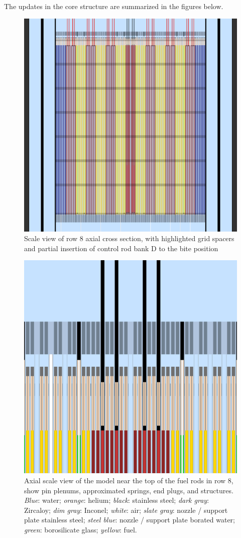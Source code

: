 \documentclass{article}
\begin{document}
The updates in the core structure are summarized in the figures below.

\begin{figure}[ht]
\centering
\includegraphics[keepaspectratio, width = 4.5 in]{figures/row_8_mats_axial_grids_enhanced}
\caption{Scale view of row 8 axial cross section, with highlighted grid spacers and partial insertion of control rod bank D to the bite position}
\label{fig:axial_row_8}
\end{figure}
\FloatBarrier 

\begin{figure}[ht]
\centering
\centering
\includegraphics[keepaspectratio, width = 2.5 in]{figures/axial_mats_row_8_topzoom}
\caption{Axial scale view of the model near the top of the fuel rods in row 8, show pin plenums, approximated springs, end plugs, and structures.  \emph{Blue}: water; \emph{orange}: helium;  \emph{black}: stainless steel; \emph{dark gray}: Zircaloy; \emph{dim gray}: Inconel; \emph{white}: air; \emph{slate gray}: nozzle / support plate stainless steel; \emph{steel blue}: nozzle / support plate borated water; \emph{green}: borosilicate glass; \emph{yellow}: fuel.}
\label{fig:top_core_zoom}
\end{figure}
\end{document}
